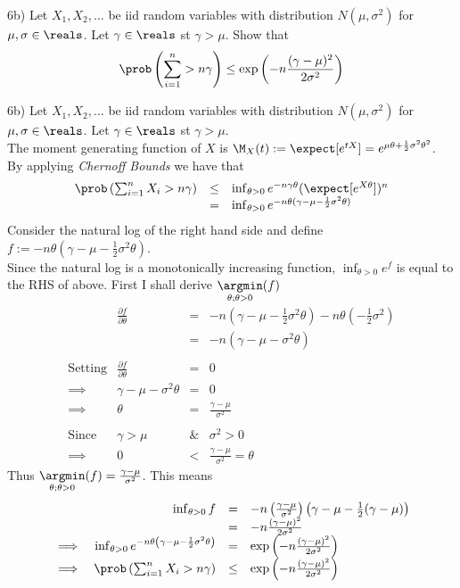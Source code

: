 \documentclass[11pt,a4paper]{article}
\begin{document}
\begin{question}{6b)}
  Let $X_1,X_2,\dots$ be iid random variables with distribution $N(\mu,\sigma^2)$ for $\mu,\sigma\in\reals$. Let $\gamma\in\reals$ st $\gamma>\mu$. Show that
  \[ \prob\left(\sum_{i=1}^n>n\gamma\right)\leq\exp\left(-n\frac{(\gamma-\mu)^2}{2\sigma^2}\right) \]
\end{question}

\begin{answer}{6b)}
  Let $X_1,X_2,\dots$ be iid random variables with distribution $N(\mu,\sigma^2)$ for $\mu,\sigma\in\reals$. Let $\gamma\in\reals$ st $\gamma>\mu$.\\
  The moment generating function of $X$ is $\M_X(t):=\expect[e^{tX}]=e^{\mu\theta+\frac12\sigma^2\theta^2}$.\\
  By applying \textit{Chernoff Bounds} we have that
  \[\begin{array}{rcl}
  \prob\left(\sum_{i=1}^nX_i>n\gamma\right)&\leq&\inf_{\theta>0}e^{-n\gamma\theta}(\expect[e^{X\theta}])^n\\
  &=&\inf_{\theta>0}e^{-n\theta(\gamma-\mu-\frac12\sigma^2\theta)}
  \end{array}\]
  Consider the natural log of the right hand side and define $f:=-n\theta(\gamma-\mu-\frac12\sigma^2\theta)$.\\
  Since the natural log is a monotonically increasing function, $\inf_{\theta>0}e^f$ is equal to the RHS of above.
  First I shall derive $\underset{\theta;\theta>0}\argmin (f)$
  \[\begin{array}{rrcl}
    &\frac{\partial f}{\partial\theta}&=&-n(\gamma-\mu-\frac12\sigma^2\theta)-n\theta(-\frac12\sigma^2)\\
    &&=&-n(\gamma-\mu-\sigma^2\theta)\\\\
    \text{Setting}&\frac{\partial f}{\partial\theta}&=&0\\
    \implies&\gamma-\mu-\sigma^2\theta&=&0\\
    \implies&\theta&=&\frac{\gamma-\mu}{\sigma^2}\\\\
    \text{Since}&\gamma>\mu&\&&\sigma^2>0\\
    \implies&0&<&\frac{\gamma-\mu}{\sigma^2}=\theta
  \end{array}\]
  Thus $\underset{\theta;\theta>0}\argmin(f)=\frac{\gamma-\mu}{\sigma^2}$. This means
  \[\begin{array}{rrcl}
    &\inf_{\theta>0}f&=&-n\left(\frac{\gamma-\mu}{\sigma^2}\right)\left(\gamma-\mu-\frac12(\gamma-\mu)\right)\\
    &&=&-n\frac{(\gamma-\mu)^2}{2\sigma^2}\\
    \implies&\inf_{\theta>0}e^{-n\theta\left(\gamma-\mu-\frac12\sigma^2\theta\right)}&=&\exp\left(-n\frac{(\gamma-\mu)^2}{2\sigma^2}\right)\\
    \implies&\prob\left(\sum_{i=1}^nX_i>n\gamma\right)&\leq&\exp\left(-n\frac{(\gamma-\mu)^2}{2\sigma^2}\right)
  \end{array}\]
\end{answer}
\end{document}
